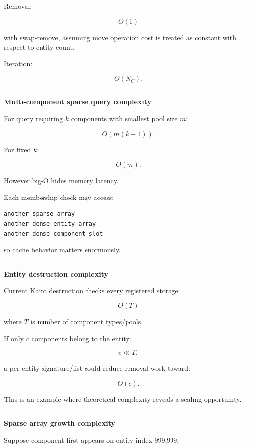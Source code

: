 Removal:

\[
O(1)
\]

with swap-remove, assuming move operation cost is treated as constant with respect to entity count.

Iteration:

\[
O(N_C).
\]

\begin{center}\rule{0.5\linewidth}{0.5pt}\end{center}

\textbf{Multi-component sparse query complexity}

For query requiring \(k\) components with smallest pool size \(m\):

\[
\boxed{
O(m(k-1)).
}
\]

For fixed \(k\):

\[
O(m).
\]

However big-O hides memory latency.

Each membership check may access:

\begin{verbatim}
another sparse array
another dense entity array
another dense component slot
\end{verbatim}

so cache behavior matters enormously.

\begin{center}\rule{0.5\linewidth}{0.5pt}\end{center}

\textbf{Entity destruction complexity}

Current Kairo destruction checks every registered storage:

\[
O(T)
\]

where \(T\) is number of component types/pools.

If only \(c\) components belong to the entity:

\[
c\ll T,
\]

a per-entity signature/list could reduce removal work toward:

\[
O(c).
\]

This is an example where theoretical complexity reveals a scaling opportunity.

\begin{center}\rule{0.5\linewidth}{0.5pt}\end{center}

\textbf{Sparse array growth complexity}

Suppose component first appears on entity index 999,999.

